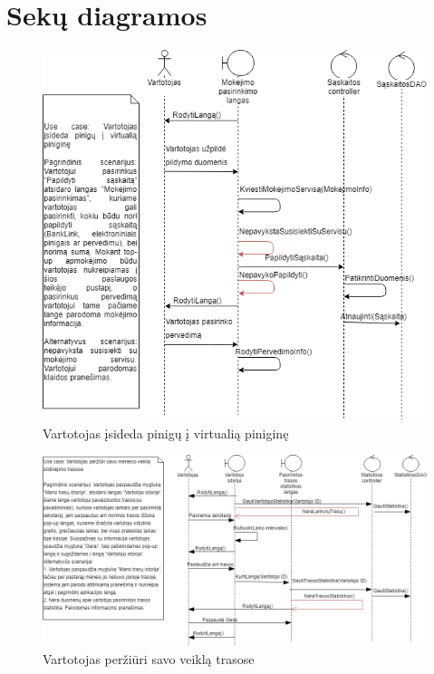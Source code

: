 \documentclass[oneside]{VUMIFPSkursinis}
\begin{document}
\section{Sekų diagramos}
			\begin{figure}[h]
    				\centering
    				\includegraphics[width=1\textwidth]{seq1.png}
    				\caption{Vartotojas įsideda pinigų į virtualią piniginę}
    				\label{fig:Vartotojas įsideda pinigų į virtualią piniginę}
			\end{figure}

			\begin{figure}[h]
    				\centering
    				\includegraphics[width=1\textwidth]{seq2.png}
    				\caption{Vartotojas peržiūri savo veiklą trasose}
    				\label{fig:Vartotojas peržiūri savo veiklą trasose}
			\end{figure}
\end{document}
